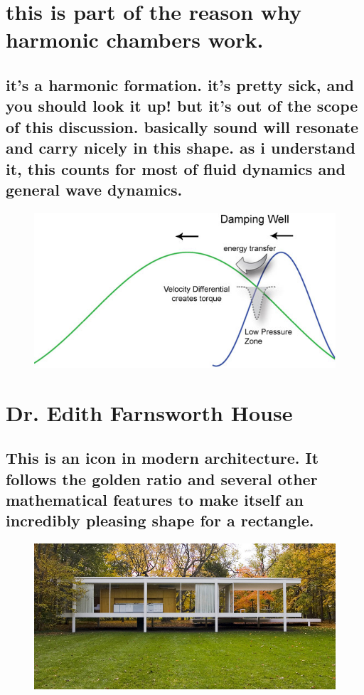 \documentclass[paper=128mm:96mm, fontsize=9pt, pagesize]{scrartcl}
\begin{document}
\clearpage

\section{this is part of the reason why harmonic chambers work.}
\subsection{it's a harmonic formation.  it's pretty sick, and you should look it up!  but it's out of the scope of this discussion.  basically sound will resonate and carry nicely in this shape.  as i understand it, this counts for most of fluid dynamics and general wave dynamics.}
\begin{figure}
	\centering
	\includegraphics[height=.5\textheight]{gfx/harmonics_dampingW.jpg}
\end{figure}

\clearpage

\section{Dr. Edith Farnsworth House}
\subsection{This is an icon in modern architecture.  It follows the golden ratio and several other mathematical features to make itself an incredibly pleasing shape for a rectangle.}
\begin{figure}
	\centering
	\includegraphics[height=.5\textheight]{gfx/41735665_psh2G-L-2.jpg}
\end{figure}
\end{document}
